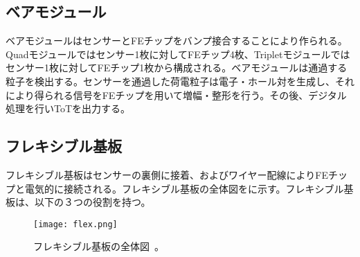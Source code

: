 \subsection{ベアモジュール}
\label{sec:bare}

ベアモジュールはセンサーとFEチップをバンプ接合することにより作られる。Quadモジュールではセンサー1枚に対してFEチップ4枚、Tripletモジュールではセンサー1枚に対してFEチップ1枚から構成される。ベアモジュールは通過する粒子を検出する。センサーを通過した荷電粒子は電子・ホール対を生成し、それにより得られる信号をFEチップを用いて増幅・整形を行う。その後、デジタル処理を行いToTを出力する。




\subsection{フレキシブル基板}
\label{sec:flex}

フレキシブル基板はセンサーの裏側に接着、およびワイヤー配線によりFEチップと電気的に接続される。フレキシブル基板の全体図をに示す。フレキシブル基板は、以下の３つの役割を持つ。

\begin{figure}[tbp]
  \centering
  \texttt{[image: flex.png]}
  \caption[フレキシブル基板]{フレキシブル基板の全体図\ \cite{itk}。}
  \label{fig:flex}
\end{figure}

